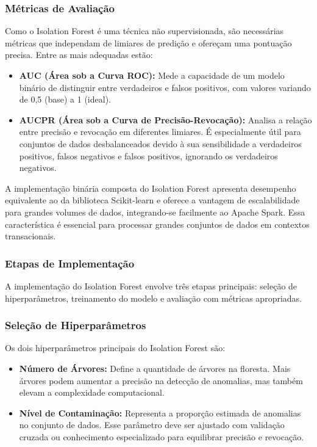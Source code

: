 \documentclass[12pt,a4paper]{article}
\begin{document}
\subsubsection{Métricas de Avaliação}
Como o Isolation Forest é uma técnica não supervisionada, são necessárias métricas que independam de limiares de predição e ofereçam uma pontuação precisa. Entre as mais adequadas estão:
\begin{itemize}
    \item \textbf{AUC (Área sob a Curva ROC):} Mede a capacidade de um modelo binário de distinguir entre verdadeiros e falsos positivos, com valores variando de 0,5 (base) a 1 (ideal).
    \item \textbf{AUCPR (Área sob a Curva de Precisão-Revocação):} Analisa a relação entre precisão e revocação em diferentes limiares. É especialmente útil para conjuntos de dados desbalanceados devido à sua sensibilidade a verdadeiros positivos, falsos negativos e falsos positivos, ignorando os verdadeiros negativos.
\end{itemize}

A implementação binária composta do Isolation Forest apresenta desempenho equivalente ao da biblioteca Scikit-learn e oferece a vantagem de escalabilidade para grandes volumes de dados, integrando-se facilmente ao Apache Spark. Essa característica é essencial para processar grandes conjuntos de dados em contextos transacionais.

\subsubsection{Etapas de Implementação}
A implementação do Isolation Forest envolve três etapas principais: seleção de hiperparâmetros, treinamento do modelo e avaliação com métricas apropriadas.

\subsubsection{Seleção de Hiperparâmetros}
Os dois hiperparâmetros principais do Isolation Forest são:
\begin{itemize}
    \item \textbf{Número de Árvores:} Define a quantidade de árvores na floresta. Mais árvores podem aumentar a precisão na detecção de anomalias, mas também elevam a complexidade computacional.
    \item \textbf{Nível de Contaminação:} Representa a proporção estimada de anomalias no conjunto de dados. Esse parâmetro deve ser ajustado com validação cruzada ou conhecimento especializado para equilibrar precisão e revocação.
\end{itemize}
\end{document}
